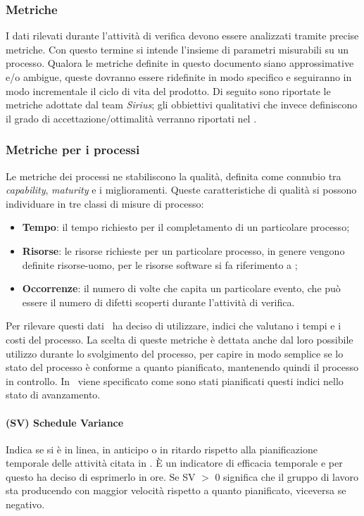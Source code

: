 \subsubsection{Metriche}
I dati rilevati durante l'attività di verifica devono essere analizzati tramite precise metriche.
Con questo termine si intende l'insieme di parametri misurabili su un processo. Qualora le metriche definite in questo documento siano approssimative e/o ambigue, queste dovranno essere ridefinite in modo specifico e seguiranno in modo incrementale il ciclo di vita del prodotto. Di seguito sono riportate le metriche adottate dal team \textit{Sirius}; gli obbiettivi qualitativi che invece definiscono il grado di accettazione/ottimalità verranno riportati nel \PianoDiQualifica{}.

\subsubsection{Metriche per i processi}
Le metriche dei processi ne stabiliscono la qualità, definita come connubio tra \textit{capability}, \textit{maturity} e i miglioramenti. Queste caratteristiche di qualità si possono individuare in tre classi di misure di processo:
\begin{itemize}
\item \textbf{Tempo}: il tempo richiesto per il completamento di un particolare processo;
\item \textbf{Risorse}: le risorse richieste per un particolare processo, in genere vengono definite risorse-uomo, per le risorse software si fa riferimento a \infoNDP;
\item \textbf{Occorrenze}: il numero di volte che capita un particolare evento, che può essere il numero di difetti scoperti durante l'attività di verifica.
\end{itemize}
Per rilevare questi dati \gruppo ~ha deciso di utilizzare, indici che valutano i tempi e i costi del processo. La scelta di queste metriche è dettata anche dal loro possibile utilizzo durante lo svolgimento del processo, per capire in modo semplice se lo stato del processo è conforme a quanto pianificato, mantenendo quindi il processo in controllo. In \infoPDP ~viene specificato come sono stati pianificati questi indici nello stato di avanzamento.
\paragraph{(SV) Schedule Variance}
Indica se si è in linea, in anticipo o in ritardo rispetto alla pianificazione temporale delle attività citata in \infoPDP.
È un indicatore di efficacia temporale e per questo \gruppo ha deciso di esprimerlo in ore.
Se SV $>$ 0 significa che il gruppo di lavoro sta producendo con maggior velocità rispetto a quanto pianificato, viceversa se negativo.\\

